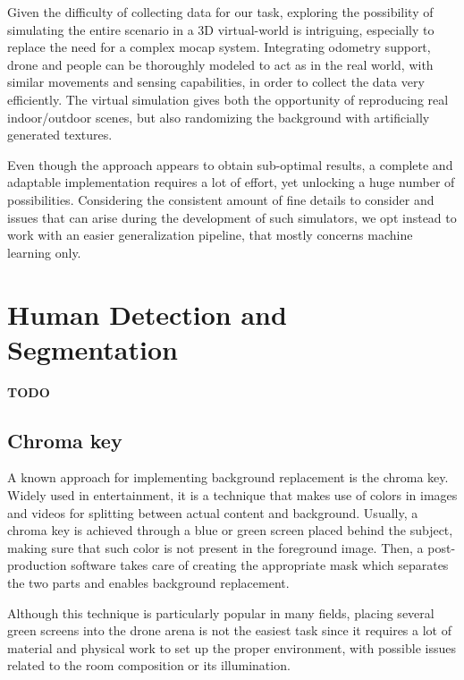\medskip

Given the difficulty of collecting data for our task, exploring the possibility of simulating the entire scenario in a 3D virtual-world is intriguing, especially to replace the need for a complex \gls{mocap} system. Integrating odometry support, drone and people can be thoroughly modeled to act as in the real world, with similar movements and sensing capabilities, in order to collect the data very efficiently. The virtual simulation gives both the opportunity of reproducing real indoor/outdoor scenes, but also randomizing the background with artificially generated textures.

Even though the approach appears to obtain sub-optimal results, a complete and adaptable implementation requires a lot of effort, yet unlocking a huge number of possibilities. Considering the consistent amount of fine details to consider and issues that can arise during the development of such simulators, we opt instead to work with an easier generalization pipeline, that mostly concerns machine learning only.




\section{Human Detection and Segmentation}
\label{sec:sota-humandetseg}

\textbf{TODO}



\subsection{Chroma key}

A known approach for implementing background replacement is the chroma key. Widely used in entertainment, it is a technique that makes use of colors in images and videos for splitting between actual content and background. Usually, a chroma key is achieved through a blue or green screen placed behind the subject, making sure that such color is not present in the foreground image. Then, a post-production software takes care of creating the appropriate mask which separates the two parts and enables background replacement.

Although this technique is particularly popular in many fields, placing several green screens into the drone arena is not the easiest task since it requires a lot of material and physical work to set up the proper environment, with possible issues related to the room composition or its illumination.

